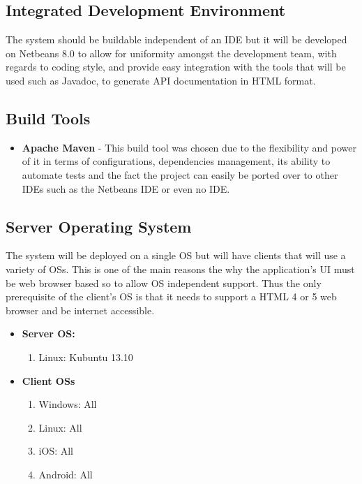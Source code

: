 \documentclass[12pt]{article}
\begin{document}
\subsection{Integrated Development Environment}
The system should be buildable independent of an IDE but it will be developed on Netbeans 8.0 to allow for uniformity amongst the development team, with regards to coding style, and provide easy integration with the tools that will be used such as Javadoc, to generate  API documentation in HTML format.

\subsection{Build Tools}
\begin{itemize}
\item \textbf{Apache Maven} - This build tool was chosen due to the flexibility and power of it in terms of configurations, dependencies management, its ability to automate tests and the fact the project can easily be ported over to other IDEs such as the Netbeans IDE or even no IDE. 
\end{itemize}

\subsection{Server Operating System}

The system will be deployed on a single OS but will have clients that will use a variety of OSs. This is one of the main reasons the why the application's UI must be web browser based so to allow OS independent support. Thus the only prerequisite of the client's OS is that it needs to support a HTML 4 or 5 web browser and be internet accessible.
\begin{itemize}
\item \textbf{Server OS:}
	\begin{enumerate}
		\item Linux: Kubuntu 13.10
	\end{enumerate}
\item \textbf{Client OSs}
	\begin{enumerate}
		\item Windows: All
		\item Linux: All
		\item iOS: All
		\item Android: All
	\end{enumerate}
\end{itemize}
\end{document}
